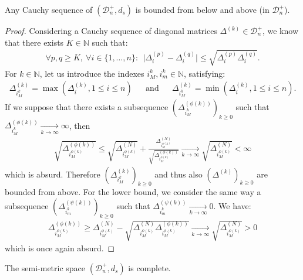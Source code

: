 \documentclass[a4papaer, titlepage]{book}
\begin{document}
\begin{lemma}\label{lem:borne_suite_de_cauchy_D_n}
  Any Cauchy sequence of $(\mathcal D_n^+,d_s)$ is bounded from below and above (in $\mathcal D_n^+$).
\end{lemma}
\begin{proof}%
  Considering a Cauchy sequence of diagonal matrices $\Delta^{(k)} \in \mathcal D_n^+$, we know that there exists $K\in \mathbb N$ such that:
  \begin{align*}
    \forall p,q\geq K, \ \forall i\in\{1,\ldots,n\}: \ \ \vert \Delta^{(p)}_i-\Delta^{(q)}_i\vert \leq \sqrt {\Delta^{(p)}_i\Delta^{(q)}_i}.
  \end{align*} 
  For $k\in \mathbb N$, let us introduce the indexes $i^k_M, i^k_m \in \mathbb N$, satisfying:
  \begin{align*}
    \Delta^{(k)}_{i^k_M} = \max \left(\Delta^{(k)}_{i}, 1\leq i \leq n\right)&
    &\text{and}&
    &\Delta^{(k)}_{i^k_M} = \min \left(\Delta^{(k)}_{i}, 1\leq i \leq n\right).
  \end{align*}
  If we suppose that there exists a subsequence $(\Delta_{i_M^k}^{(\phi(k))})_{k\geq 0}$ such that $\Delta_{i_M^k}^{(\phi(k))} \underset{k \to\infty}{\longrightarrow}  \infty$, then
  \begin{align*}
    \sqrt{\Delta^{(\phi(k))}_{i^{\phi(k)}_M}} \leq \sqrt{\Delta^{(N)}_{i^{\phi(k)}_M} } + \frac{\Delta^{(N)}_{i^{\phi(k)}_M}}{\sqrt{\Delta^{(\phi(k))}_{i^{\phi(k)}_M}}}\underset{k \to\infty}{\longrightarrow} \sqrt{\Delta^{(N)}_{i^{\phi(k)}_M} } < \infty
  \end{align*}
  which is absurd. Therefore $(\Delta_{i^{k}_M}^{(k)})_{k\geq 0}$ and thus also $(\Delta^{(k)})_{k\geq 0}$ are bounded from above. For the lower bound, we consider the same way a subsequence $(\Delta_{i_m^k}^{(\psi(k))})_{k\geq 0}$ such that $\Delta_{i_m^k}^{(\psi(k))} \underset{k \to\infty}{\longrightarrow}  0$. We have:
  \begin{align*}
    \Delta^{(\phi(k))}_{i^{\phi(k)}_M} \geq \Delta^{(N)}_{i^{\phi(k)}_M}  - \sqrt{\Delta^{(N)}_{i^{\phi(k)}_M}\Delta^{(\phi(k))}_{i^{\phi(k)}_M}}\underset{k \to\infty}{\longrightarrow} \sqrt{\Delta^{(N)}_{i^{\phi(k)}_M} } >0
  \end{align*}
  which is once again absurd.
\end{proof}
\begin{property}\label{prot:D_n_complet}
  The semi-metric space $(\mathcal D_n^+,d_s)$ is complete.
\end{property}
\end{document}
